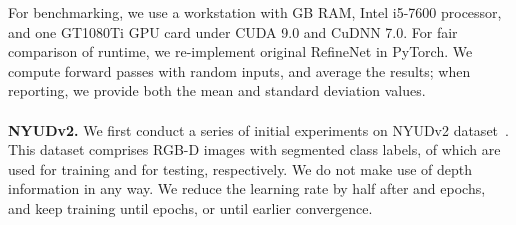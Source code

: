 \documentclass{bmvc2k}
\begin{document}
For benchmarking, we use a workstation with GB RAM, Intel i5-7600 processor, and one GT1080Ti GPU card under CUDA 9.0 and CuDNN 7.0. For fair comparison of runtime, we re-implement original RefineNet in PyTorch. We compute  forward passes with random inputs, and average the results; when reporting, we provide both the mean and standard deviation values.\\
\\
\textbf{NYUDv2.} We first conduct a series of initial experiments on NYUDv2 dataset~\cite{SilbermanHKF12,GuptaAM13}. This dataset comprises  RGB-D images with  segmented class labels, of which  are used for training and  for testing, respectively. We do not make use of depth information in any way. We reduce the learning rate by half after  and  epochs, and keep training until  epochs, or until earlier convergence.

\begin{table}
\begin{center}
\end{center}
\caption{Quantitative results on the test sets of NYUDv2 and PASCAL Person-Part. Mean iou, the number of parameters and the runtime (meanstd) of one forward pass on  inputs are reported, where possible. Multi-scale evaluation is defined as \emph{msc}.\label{table:nyu-person}}
\vskip -0.15in
\end{table}
\end{document}
